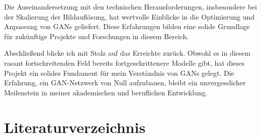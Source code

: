 \documentclass[a4paper, 12pt]{article}
\begin{document}
Die Auseinandersetzung mit den technischen Herausforderungen, insbesondere bei der Skalierung der Bildauflösung, hat wertvolle Einblicke in die Optimierung und Anpassung von GANs geliefert. Diese Erfahrungen bilden eine solide Grundlage für zukünftige Projekte und Forschungen in diesem Bereich.

Abschließend blicke ich mit Stolz auf das Erreichte zurück. Obwohl es in diesem rasant fortschreitenden Feld bereits fortgeschrittenere Modelle gibt, hat dieses Projekt ein solides Fundament für mein Verständnis von GANs gelegt. Die Erfahrung, ein GAN-Netzwerk von Null aufzubauen, bleibt ein unvergesslicher Meilenstein in meiner akademischen und beruflichen Entwicklung.


\section{Literaturverzeichnis}


\end{document}

